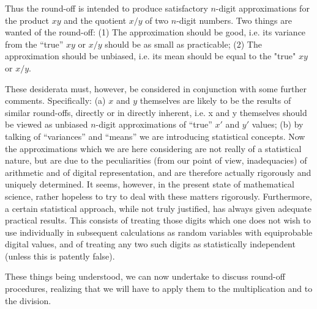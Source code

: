 \documentclass[12pt]{amsart}
\begin{document}
Thus the round-off is intended to produce satisfactory $n$-digit approximations for the product $xy$ and the quotient $x/y$ of two $n$-digit numbers. Two things are wanted of the round-off: (1) The approximation should be good, i.e. its variance from the ``true'' $xy$ or $x/y$ should be as small as practicable; (2) The approximation should be unbiased, i.e. its mean should be equal to the "true" $xy$ or $x/y$.

These desiderata must, however, be considered in conjunction with some further comments. Specifically: (a) $x$ and $y$ themselves are likely to be the results of similar round-offs, directly or in directly inherent, i.e. x and y themselves should be viewed as unbiased $n$-digit approximations of ``true'' $x'$ and $y'$ values; (b) by talking of ``variances'' and ``means'' we are introducing statistical concepts. Now the approximations which we are here considering are not really of a statistical nature, but are due to the peculiarities (from our point of view, inadequacies) of arithmetic and of digital representation, and are therefore actually rigorously and uniquely determined. It seems, however, in the present state of mathematical science, rather hopeless to try to deal with these matters rigorously. Furthermore, a certain statistical approach, while not truly justified, has always given adequate practical results. This consists of treating those digits which one does not wish to use individually in subsequent calculations as random variables with equiprobable digital values, and of treating any two such digits as statistically independent (unless this is patently false).

These things being understood, we can now undertake to discuss round-off procedures, realizing that we will have to apply them to the multiplication and to the division.
\end{document}
